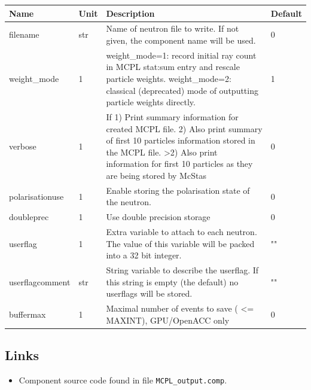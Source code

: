 \begin{longtable}{p{}p{}p{}p{}}
\toprule
\textbf{Name} & \textbf{Unit} & \textbf{Description} & \textbf{Default} \\
\midrule
\endhead
filename & str & Name of neutron file to write. If not given, the component name will be used. & 0 \\
weight\_mode & 1 & weight\_mode=1: record initial ray count in MCPL stat:sum entry and rescale particle weights. weight\_mode=2: classical (deprecated) mode of outputting particle weights directly. & 1 \\
verbose & 1 & If 1) Print summary information for created MCPL file. 2) Also print summary of first 10 particles information stored in the MCPL file. \textgreater{}2) Also print information for first 10 particles as they are being stored by McStas & 0 \\
polarisationuse & 1 & Enable storing the polarisation state of the neutron. & 0 \\
doubleprec & 1 & Use double precision storage & 0 \\
userflag & 1 & Extra variable to attach to each neutron. The value of this variable will be packed into a 32 bit integer. & "" \\
userflagcomment & str & String variable to describe the userflag. If this string is empty (the default) no userflags will be stored. & "" \\
buffermax & 1 & Maximal number of events to save ( \textless{}= MAXINT), GPU/OpenACC only & 0 \\
\bottomrule
\end{longtable}

\subsection*{Links}
\begin{itemize}
  \item Component source code found in file \texttt{MCPL\_output.comp}.
\end{itemize}

